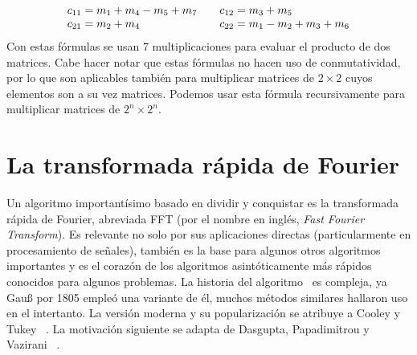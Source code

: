 \begin{example}
    \begin{align*}
      \begin{array}{l@{\qquad}l}
        c_{1 1}
          = m_1 + m_4 - m_5 + m_7 &
        c_{1 2}
          = m_3 + m_5 \\
        c_{2 1}
          = m_2 + m_4 &
        c_{2 2}
          = m_1 - m_2 + m_3 + m_6
      \end{array}
    \end{align*}
    Con estas fórmulas se usan \num{7} multiplicaciones
    para evaluar el producto de dos matrices.
    Cabe hacer notar que estas fórmulas no hacen uso de conmutatividad,
    por lo que son aplicables también
    para multiplicar matrices de \(2 \times 2\)
    cuyos elementos son a su vez matrices.
    Podemos usar esta fórmula recursivamente
    para multiplicar matrices de \(2^n \times 2^n\).
  \end{example}

\section{La transformada rápida de Fourier}
\label{sec:FFT}

  Un algoritmo importantísimo basado en dividir y conquistar
  es la transformada rápida de Fourier,
  abreviada FFT
  (por el nombre en inglés,
   \emph{\foreignlanguage{english}{Fast Fourier Transform}}).
  Es relevante no solo por sus aplicaciones directas
  (particularmente en procesamiento de señales),
  también es la base para algunos otros algoritmos importantes
  y es el corazón de los algoritmos asintóticamente más rápidos conocidos
  para algunos problemas.
  La historia del algoritmo~%
    \cite{heideman84:_gauss_history_FFT }
  es compleja,
  ya Gauß por 1805 empleó una variante de él,
  muchos métodos similares hallaron uso en el intertanto.
  La versión moderna y su popularización se atribuye a Cooley y Tukey~%
    \cite{cooley65:_FFT}.
  La motivación siguiente se adapta de Dasgupta, Papadimitrou y Vazirani~%
    \cite{dasgupta06:_algorithms}.

